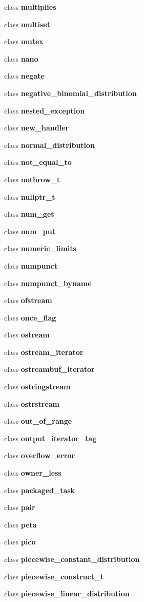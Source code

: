 \begin{DoxyCompactItemize}
class {\bf multiplies}
\item 
class {\bf multiset}
\item 
class {\bf mutex}
\item 
class {\bf nano}
\item 
class {\bf negate}
\item 
class {\bf negative\+\_\+binomial\+\_\+distribution}
\item 
class {\bf nested\+\_\+exception}
\item 
class {\bf new\+\_\+handler}
\item 
class {\bf normal\+\_\+distribution}
\item 
class {\bf not\+\_\+equal\+\_\+to}
\item 
class {\bf nothrow\+\_\+t}
\item 
class {\bf nullptr\+\_\+t}
\item 
class {\bf num\+\_\+get}
\item 
class {\bf num\+\_\+put}
\item 
class {\bf numeric\+\_\+limits}
\item 
class {\bf numpunct}
\item 
class {\bf numpunct\+\_\+byname}
\item 
class {\bf ofstream}
\item 
class {\bf once\+\_\+flag}
\item 
class {\bf ostream}
\item 
class {\bf ostream\+\_\+iterator}
\item 
class {\bf ostreambuf\+\_\+iterator}
\item 
class {\bf ostringstream}
\item 
class {\bf ostrstream}
\item 
class {\bf out\+\_\+of\+\_\+range}
\item 
class {\bf output\+\_\+iterator\+\_\+tag}
\item 
class {\bf overflow\+\_\+error}
\item 
class {\bf owner\+\_\+less}
\item 
class {\bf packaged\+\_\+task}
\item 
class {\bf pair}
\item 
class {\bf peta}
\item 
class {\bf pico}
\item 
class {\bf piecewise\+\_\+constant\+\_\+distribution}
\item 
class {\bf piecewise\+\_\+construct\+\_\+t}
\item 
class {\bf piecewise\+\_\+linear\+\_\+distribution}

\end{DoxyCompactItemize}
